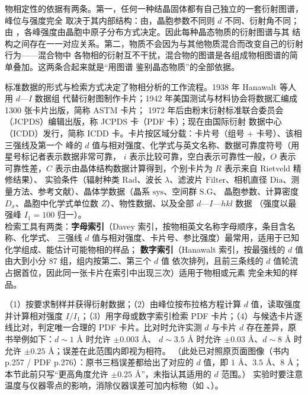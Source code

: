 \begin{principle}
物相定性的依据有两条。第一，任何一种结晶固体都有自己独立的一套衍射图谱，峰位与强度完全
取决于其内部结构：由，晶胞参数不同则 $d$ 不同、衍射角不同；由
，各峰强度由晶胞中原子分布方式决定。因此每种晶态物质的衍射图谱与其
结构之间存在一一对应关系。第二，物质不会因为与其他物质混合而改变自己的衍射行为——混合物中
各物相的衍射互不干扰，混合物的图谱是各组成物相图谱的简单叠加。这两条合起来就是“用图谱
鉴别晶态物质”的全部依据。
\end{principle}

\begin{measure}
标准数据的形式与检索方式决定了物相分析的工作流程。1938 年 Hanawalt 等人用 $d$—$I$ 数据组
代替衍射图制作卡片；1942 年美国测试与材料协会将数据汇编成 1300 张卡片出版，简称 ASTM 卡片；
1972 年后由粉末衍射标准联合委员会（JCPDS）编辑出版，称 JCPDS 卡（PDF 卡）；现在由国际衍射
数据中心（ICDD）发行，简称 ICDD 卡。卡片按区域分载：卡片号（组号 + 卡号）、该相三强线及第一个
峰的 $d$ 值与相对强度、化学式与英文名称、数据可靠度符号（用星号标记者表示数据非常可靠，
$i$ 表示比较可靠，空白表示可靠性一般，$O$ 表示可靠性差，$C$ 表示由晶体结构数据计算得到，个别卡片为 $R$ 表示来自 Rietveld 精修结果）、
实验条件（辐射种类 $\mathrm{Rad}$、波长 $\lambda$、滤波片 $\mathrm{Filter}$、相机直径
$\mathrm{Dia}$、测量方法、参考文献）、晶体学数据（晶系 $\mathrm{sys}$、空间群 $\mathrm{S.G}$、
晶胞参数、计算密度 $D_{x}$、晶胞中化学式单位数 $Z$）、物性数据、以及全部 $d$—$I$—$hkl$ 数据
（强度以最强峰 $I_{1}=100$ 归一）。\\
检索工具有两类：\textbf{字母索引}（Davey 索引，按物相英文名称字母顺序，条目含名称、化学式、
三强线 $d$ 值与相对强度、卡片号、参比强度）最常用，适用于已知化学组成、能估计可能物相的样品；
\textbf{数字索引}（Hanawalt 索引，按最强线的 $d$ 值由大到小分 87 组，组内按第二、第三个 $d$ 值
依次排列，且前三条线的 $d$ 值轮流占据首位，因此同一张卡片在索引中出现三次）适用于物相或元素
完全未知的样品。
\end{measure}

\begin{dataflow}
（1）按要求制样并获得衍射数据；（2）由峰位按布拉格方程计算 $d$ 值，读取强度并计算相对强度
$I/I_{1}$；（3）用字母或数字索引检索 PDF 卡片；（4）与候选卡片逐线比对，判定唯一合理的 PDF
卡片。比对时允许实测 $d$ 与卡片 $d$ 存在差异，原书举例如下：$d\sim1$ Å 时允许 $\pm0.003$ Å、
$d\sim3.5$ Å 时允许 $\pm0.03$ Å、$d\sim8$ Å 时允许 $\pm0.25$ Å；误差在此范围内即视为相符。
（此处已对照原页面图像（书内 p.257 / PDF p.276）：原书三档误差都给出了对应的 $d$ 值，即
$1$ Å、$3.5$ Å、$8$ Å；本节此前只写“更高角度允许 $\pm0.25$ Å”，未指认其适用的 $d$ 范围。）
实验时要注意温度与仪器零点的影响，消除仪器误差可加内标物（如 、）。
\end{dataflow}

